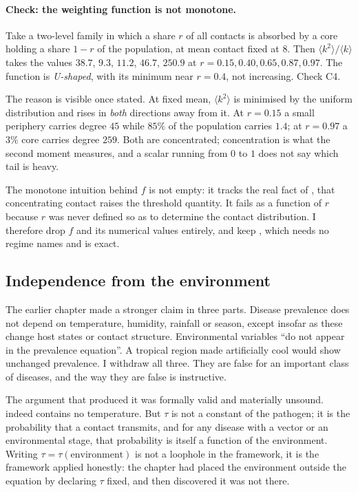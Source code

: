 \paragraph{Check: the weighting function is not monotone.} \lnkC{} Take a
two-level family in which a share $r$ of all contacts is absorbed by a core
holding a share $1-r$ of the population, at mean contact fixed at $8$. Then
$\langle k^2\rangle/\langle k\rangle$ takes the values $38.7$, $9.3$,
$11.2$, $46.7$, $250.9$ at $r=0.15,0.40,0.65,0.87,0.97$. The function is
\emph{U-shaped}, with its minimum near $r=0.4$, not increasing. Check C4.

The reason is visible once stated. At fixed mean, $\langle k^2\rangle$ is
minimised by the uniform distribution and rises in \emph{both} directions
away from it. At $r=0.15$ a small periphery carries degree $45$ while $85\%$
of the population carries $1.4$; at $r=0.97$ a $3\%$ core carries degree
$259$. Both are concentrated; concentration is what the second moment
measures, and a scalar running from $0$ to $1$ does not say which tail is
heavy. \lnkD

\begin{remark}
\label{sm:rem-weighting}
The monotone intuition behind $f$ is not empty: it tracks the real fact of
, that concentrating contact raises the threshold
quantity. It fails as a function of $r$ because $r$ was never defined so as
to determine the contact distribution. I therefore drop $f$ and its
numerical values entirely, and keep , which needs no regime
names and is exact.
\end{remark}

\subsection{Independence from the environment}
\label{sm:sec:environment}

The earlier chapter made a stronger claim in three parts. Disease prevalence
does not depend on temperature, humidity, rainfall or season, except
insofar as these change host states or contact structure. Environmental
variables ``do not appear in the prevalence equation''. A tropical region
made artificially cool would show unchanged prevalence. I withdraw all
three. They are false for an important class of diseases, and the way they
are false is instructive.

The argument that produced it was formally valid and materially
unsound.  indeed contains no temperature. But $\tau$ is not
a constant of the pathogen; it is the probability that a contact transmits,
and for any disease with a vector or an environmental stage, that
probability is itself a function of the environment. Writing
$\tau=\tau(\text{environment})$ is not a loophole in the framework, it is
the framework applied honestly: the chapter had placed the environment
outside the equation by declaring $\tau$ fixed, and then discovered it was
not there.

